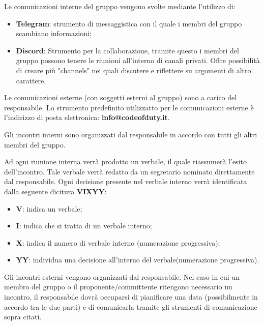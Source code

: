 				Le comunicazioni interne del gruppo vengono svolte mediante l'utilizzo di:
				\begin{itemize}
					\item \textbf{Telegram}: strumento di messaggistica con il quale i membri del gruppo scambiano informazioni;
					\item \textbf{Discord}: Strumento per la collaborazione, tramite questo i membri del gruppo possono tenere le riunioni all'interno di canali privati. Offre possibilità di creare più "channels" nei quali discutere e riflettere su argomenti di altro carattere.
				\end{itemize}  
				
				Le comunicazioni esterne (con soggetti esterni al gruppo) sono a carico del responsabile. Lo strumento predefinito utilizzatto per le comunicazioni esterne è l'indirizzo di posta elettronica: \textbf{info@codeofduty.it}.
				
			
			
				Gli incontri interni sono organizzati dal responsabile in accordo con tutti gli altri membri del gruppo. 
				
				Ad ogni riunione interna verrà prodotto un verbale, il quale riassumerà l'esito dell'incontro. Tale verbale verrà redatto da un segretario nominato direttamente dal responsabile. Ogni decisione presente nel verbale interno verrà identificata dalla seguente dicitura \textbf{VIXYY}:
				\begin{itemize}
					\item \textbf{V}: indica un verbale;
					\item\textbf{I}: indica che si tratta di un verbale interno;
					\item\textbf{X}: indica il numero di verbale interno (numerazione progressiva);
					\item\textbf{YY}: individua una decisione all'interno del verbale(numerazione progressiva).
				\end{itemize}
			
				Gli incontri esterni vengono organizzati dal responsabile. Nel caso in cui un membro del gruppo o il proponente/committente ritengono necessario un incontro, il responsabile dovrà occuparsi di pianificare una data (possibilmente in accordo tra le due parti) e di comunicarla tramite gli strumenti di comunicazione sopra citati.
				
